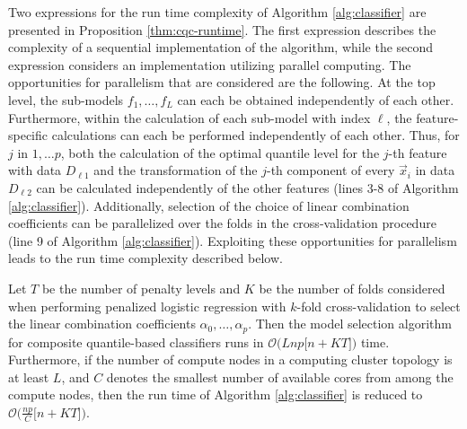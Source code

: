 
Two expressions for the run time complexity of Algorithm \ref{alg:classifier}
are presented in Proposition \ref{thm:cqc-runtime}.  The first expression
describes the complexity of a sequential implementation of the algorithm, while
the second expression considers an implementation utilizing parallel computing.
The opportunities for parallelism that are considered are the following.  At the
top level, the sub-models $f_1, \dots, f_L$ can each be obtained independently
of each other.  Furthermore, within the calculation of each sub-model with index
$\ell$, the feature-specific calculations can each be performed independently of
each other.  Thus, for $j$ in $1, \dots p$, both the calculation of the optimal
quantile level for the $j$-th feature with data $D_{\ell 1}$ and the
transformation of the $j$-th component of every $\vec{x}_i$ in data $D_{\ell 2}$
can be calculated independently of the other features (lines 3-8 of Algorithm
\ref{alg:classifier}).  Additionally, selection of the choice of linear
combination coefficients can be parallelized over the folds in the
cross-validation procedure (line 9 of Algorithm \ref{alg:classifier}).
Exploiting these opportunities for parallelism leads to the run time complexity
described below.

\begin{proposition}
  \label{thm:cqc-runtime}
  Let $T$ be the number of penalty levels and $K$ be the number of folds
  considered when performing penalized logistic regression with $k$-fold
  cross-validation to select the linear combination coefficients
  $\alpha_0, \dots, \alpha_p$.  Then the model selection algorithm for composite
  quantile-based classifiers runs in
  $\mathcal{O}\Big( Lnp \big[ n + KT \big]\Big)$ time.  Furthermore, if the
  number of compute nodes in a computing cluster topology is at least $L$, and
  $C$ denotes the smallest number of available cores from among the compute
  nodes, then the run time of Algorithm \ref{alg:classifier} is reduced to
  $\mathcal{O}\Big( \frac{np}{C} \big[ n + KT \big] \Big)$.
\end{proposition}

